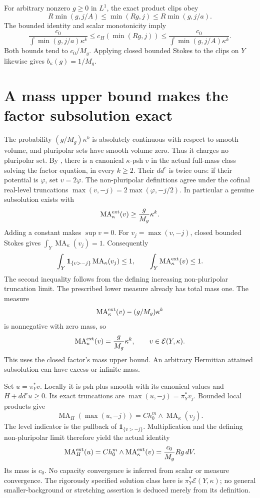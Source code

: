\documentclass[11pt]{article}
\newcommand{\ddc}{dd^c}
\newcommand{\MA}{\operatorname{MA}}
\theoremstyle{remark}\newtheorem{remark}[theorem]{Remark}
\begin{document}
For arbitrary nonzero $g\geq0$ in $L^1$, the exact product clips obey
\[
 R\min(g,j/A)\leq\min(Rg,j)\leq R\min(g,j/a).
\]
The bounded identity and scalar monotonicity imply
\[
 \frac{c_0}{\int\min(g,j/a)\kappa^k}
 \leq c_H(\min(Rg,j))
 \leq\frac{c_0}{\int\min(g,j/A)\kappa^k}.
\]
Both bounds tend to $c_0/M_g$. Applying closed bounded Stokes to the
clips on $Y$ likewise gives $b_\kappa(g)=1/M_g$.

\section{A mass upper bound makes the factor subsolution exact}
The probability $(g/M_g)\kappa^k$ is absolutely continuous with respect
to smooth volume, and pluripolar sets have smooth volume zero. Thus it
charges no pluripolar set. By \cite[Theorem A, Theorem 4.6]{GZ},
there is a canonical $\kappa$-psh $v$ in the actual full-mass class
solving the factor equation, in every $k\geq2$. Their $dd^c$ is twice
ours: if their potential is $\varphi$, set $v=2\varphi$. The
non-pluripolar definitions agree under the cofinal real-level
truncations $\max(v,-j)=2\max(\varphi,-j/2)$.
In particular a genuine subsolution exists with
\[
 \MA_\kappa^{\rm ext}(v)\geq\frac{g}{M_g}\kappa^k.
\]
Adding a constant makes $\sup v=0$. For $v_j=\max(v,-j)$, closed
bounded Stokes gives $\int_Y\MA_\kappa(v_j)=1$. Consequently
\[
 \int_Y\mathbf1_{\{v>-j\}}\MA_\kappa(v_j)\leq1,
 \qquad\int_Y\MA_\kappa^{\rm ext}(v)\leq1.
\]
The second inequality follows from the defining increasing
non-pluripolar truncation limit. The prescribed lower measure already
has total mass one. The measure
\[
 \MA_\kappa^{\rm ext}(v)-(g/M_g)\kappa^k
\]
is nonnegative with zero mass, so
\begin{equation}\label{eq:factor}
 \MA_\kappa^{\rm ext}(v)=\frac{g}{M_g}\kappa^k,
 \qquad v\in\mathcal E(Y,\kappa).
\end{equation}
This uses the closed factor's mass upper bound. An arbitrary
Hermitian attained subsolution can have excess or infinite mass.

Set $u=\pi_Y^*v$. Locally it is psh plus smooth with its canonical
values and $H+\ddc u\geq0$. Its exact truncations are
$\max(u,-j)=\pi_Y^*v_j$. Bounded local products give
\[
 \MA_H(\max(u,-j))=C h_0^m\wedge\MA_\kappa(v_j).
\]
The level indicator is the pullback of $\mathbf1_{\{v>-j\}}$.
Multiplication and the defining non-pluripolar limit therefore yield
the actual identity
\[
 \MA_H^{\rm ext}(u)=C h_0^m\wedge\MA_\kappa^{\rm ext}(v)
                   =\frac{c_0}{M_g}Rg\,dV.
\]
Its mass is $c_0$. No capacity convergence is inferred from scalar or
measure convergence. The rigorously specified solution class here is
$\pi_Y^*\mathcal E(Y,\kappa)$; no general smaller-background or
stretching assertion is deduced merely from its definition.
\end{document}
